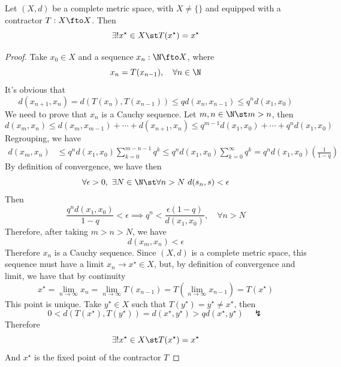 \documentclass[../mmf.tex]{subfiles}
\begin{document}
\begin{thm}
	Let $(X,d)$ be a complete metric space, with $X\ne\{\}$ and equipped with a contractor $T:X\fto X$. Then
	\begin{equation}
		\exists!x^{\star}\in X\st T(x^\star)=x^\star
		\label{eq:fixedpointbanach}
	\end{equation}
\end{thm}
\begin{proof}
	Take $x_0\in X$ and a sequence $x_n:\N\fto X$, where
	\begin{equation*}
		x_n=T(x_{n-1}),\quad\forall n\in\N
	\end{equation*}
	It's obvious that
	\begin{equation*}
		d(x_{n+1},x_{n})=d(T(x_{n}),T(x_{n-1}))\le qd(x_n,x_{n-1})\le q^nd(x_1,x_0)
	\end{equation*}
	We need to prove that $x_n$ is a Cauchy sequence. Let $m,n\in\N\st m>n$, then
	\begin{equation*}
		d(x_m,x_n)\le d(x_m,x_{m-1})+\cdots+d(x_{n+1},x_n)\le q^{m-1}d(x_1,x_0)+\cdots+q^nd(x_1,x_0)
	\end{equation*}
	Regrouping, we have
	\begin{equation*}
		\begin{aligned}
			d(x_m,x_n)&\le q^nd(x_1,x_0)\sum_{k=0}^{m-n-1}q^k\le q^nd(x_1,x_0)\sum_{k=0}^{\infty}q^k=q^nd(x_1,x_0)\left( \frac{1}{1-q} \right)
		\end{aligned}
	\end{equation*}
	By definition of convergence, we have then
	\begin{equation*}
		\forall\epsilon>0,\ \exists N\in\N\st\forall n>N\ d(s_n,s)<\epsilon
	\end{equation*}
	Then
	\begin{equation*}
		\frac{q^nd(x_1,x_0)}{1-q}<\epsilon\implies{} q^n<\frac{\epsilon(1-q)}{d(x_1,x_0)},\quad\forall n>N
	\end{equation*}
	Therefore, after taking $m>n>N$, we have
	\begin{equation*}
		d(x_m,x_n)<\epsilon
	\end{equation*}
	Therefore $x_n$ is a Cauchy sequence. Since $(X,d)$ is a complete metric space, this sequence must have a limit $x_n\to x^\star\in X$, but, by definition of convergence and limit, we have that by continuity
	\begin{equation*}
		x^\star=\lim_{n\to\infty}x_n=\lim_{n\to\infty}T(x_{n-1})=T\left( \lim_{n\to\infty}x_{n-1} \right)=T(x^\star)
	\end{equation*}
	This point is unique. Take $y^\star\in X$ such that $T(y^\star)=y^\star\ne x^\star$, then
	\begin{equation*}
		0<d(T(x^\star),T(y^\star))=d(x^\star,y^\star)>qd(x^\star,y^\star)\quad\lightning
	\end{equation*}
	Therefore
	\begin{equation*}
		\exists!x^\star\in X\st T(x^\star)=x^\star
	\end{equation*}
	And $x^\star$ is the fixed point of the contractor $T$
\end{proof}
\end{document}
